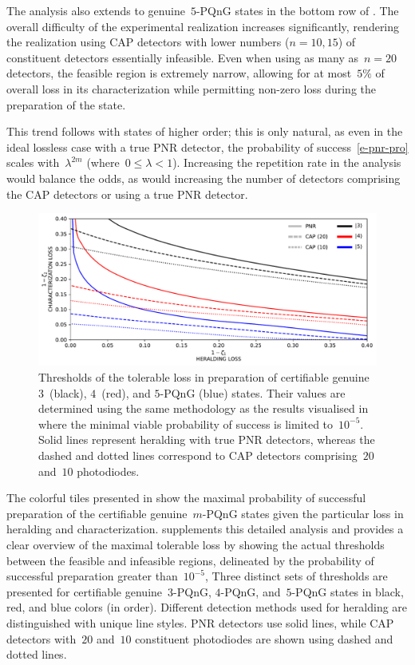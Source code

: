 \documentclass{article}
\begin{document}
The analysis also extends to genuine~$5$-PQnG states in the {bottom} row of . The overall difficulty of the experimental realization increases significantly, rendering the realization using CAP detectors with lower numbers (${n = 10, 15}$) of constituent detectors essentially infeasible. Even when using as many as~${n = 20}$ detectors, the feasible region is extremely narrow, allowing for at most~$5\%$ of overall loss in its characterization while permitting non-zero loss during the preparation of the state.

This trend follows with states of higher order; this is only natural, as even in the ideal lossless case with a true PNR detector, the probability of success~\eqref{e-pnr-pro} scales with~${\lambda^{2m}}$ (where~${0 \leq \lambda < 1}$). Increasing the repetition rate in the analysis would balance the odds, as would increasing the number of detectors comprising the CAP detectors or using a true PNR detector.

\begin{figure}[h]
  \begin{center}
    \includegraphics[width = \columnwidth]{import/202504/curves_unified_03_04_05_10dB-1001.pdf}
  \end{center}
  \caption{
    Thresholds of the tolerable loss in preparation of certifiable genuine $3$~(black), $4$~(red), and $5$-PQnG (blue) states. Their values are determined using the same methodology as the results visualised in  where the minimal viable probability of success is limited to~$10^{-5}$. Solid lines represent heralding with true PNR detectors, whereas the dashed and dotted lines correspond to CAP detectors comprising~$20$ and~$10$ photodiodes.
  }
  \label{f-thr-345}
\end{figure}

The colorful tiles presented in  show the maximal probability of successful preparation of the certifiable genuine~$m$-PQnG states given the particular loss in heralding and characterization.  supplements this detailed analysis and provides a clear overview of the maximal tolerable loss by showing the actual thresholds between the feasible and infeasible regions, delineated by the probability of successful preparation greater than~$10^{-5}$, 
%
Three distinct sets of thresholds are presented for certifiable genuine~$3$-PQnG, $4$-PQnG, and~$5$-PQnG states in black, red, and blue colors (in order). Different detection methods used for heralding are distinguished with unique line styles. PNR detectors use solid lines, while CAP detectors with~$20$ and~$10$ constituent photodiodes are shown using dashed and dotted lines.
\end{document}
